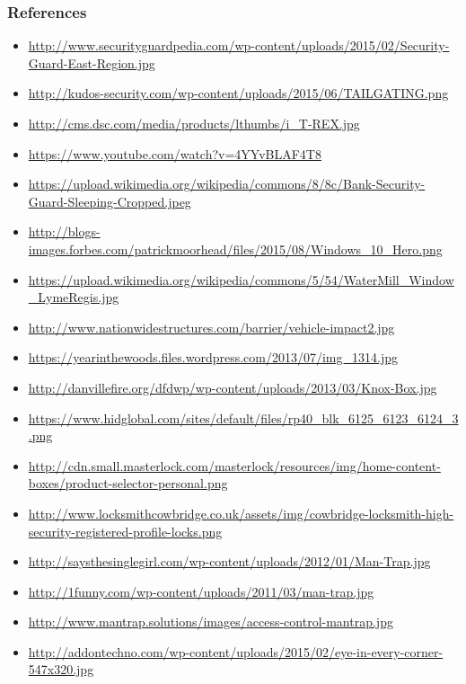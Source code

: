 \documentclass[]{beamer}
\begin{document}
\begin{frame}[allowframebreaks]
  \frametitle{References}
  \begin{itemize}
    \item \url{http://www.securityguardpedia.com/wp-content/uploads/2015/02/Security-Guard-East-Region.jpg}
    \item \url{http://kudos-security.com/wp-content/uploads/2015/06/TAILGATING.png}
    \item \url{http://cms.dsc.com/media/products/lthumbs/i_T-REX.jpg}
    \item \url{https://www.youtube.com/watch?v=4YYvBLAF4T8}
    \item \url{https://upload.wikimedia.org/wikipedia/commons/8/8c/Bank-Security-Guard-Sleeping-Cropped.jpeg}
    \item \url{http://blogs-images.forbes.com/patrickmoorhead/files/2015/08/Windows_10_Hero.png}
    \item \url{https://upload.wikimedia.org/wikipedia/commons/5/54/WaterMill_Window_LymeRegis.jpg}
    \item \url{http://www.nationwidestructures.com/barrier/vehicle-impact2.jpg}
    \item \url{https://yearinthewoods.files.wordpress.com/2013/07/img_1314.jpg}
    \item \url{http://danvillefire.org/dfdwp/wp-content/uploads/2013/03/Knox-Box.jpg}
    \item \url{https://www.hidglobal.com/sites/default/files/rp40_blk_6125_6123_6124_3.png}
    \item \url{http://cdn.small.masterlock.com/masterlock/resources/img/home-content-boxes/product-selector-personal.png}
    \item \url{http://www.locksmithcowbridge.co.uk/assets/img/cowbridge-locksmith-high-security-registered-profile-locks.png}
    \item \url{http://saysthesinglegirl.com/wp-content/uploads/2012/01/Man-Trap.jpg}
    \item \url{http://1funny.com/wp-content/uploads/2011/03/man-trap.jpg}
    \item \url{http://www.mantrap.solutions/images/access-control-mantrap.jpg}
    \item \url{http://addontechno.com/wp-content/uploads/2015/02/eye-in-every-corner-547x320.jpg}
  \end{itemize}

\end{frame}
\end{document}
